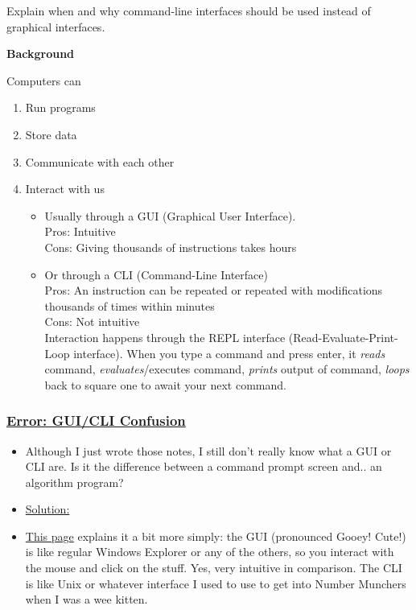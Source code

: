 \documentclass[12pt]{article}
\begin{document}
Explain when and why command-line interfaces should be used instead of graphical interfaces.
\color{black}

\vspace{1em}
\textbf{Background}

Computers can
\begin{enumerate}
    \item Run programs
    \item Store data
    \item Communicate with each other
    \item Interact with us
    \begin{itemize}
        \item Usually through a GUI (Graphical User Interface). 
        \\Pros: Intuitive
        \\Cons: Giving thousands of instructions takes hours
        \item Or through a CLI (Command-Line Interface)
        \\Pros: An instruction can be repeated or repeated with modifications thousands of times within minutes
        \\Cons: Not intuitive
        \\Interaction happens through the REPL interface (Read-Evaluate-Print-Loop interface). When you type a command and press enter, it \textit{reads} command, \textit{evaluates}/executes command, \textit{prints} output of command, \textit{loops} back to square one to await your next command.
    \end{itemize}
\end{enumerate}

\subsubsection{\underline{Error: GUI/CLI Confusion}}\label{error:er12}
\begin{itemize}
    \item Although I just wrote those notes, I still don't really know what a GUI or CLI are. Is it the difference between a command prompt screen and.. an algorithm program?
\end{itemize}
\begin{itemize}
\renewcommand{\labelitemi}{$\nobullet$}
\item \underline{Solution:}
\renewcommand{\labelitemi}{$\bullet$}
    \item \href{https://study.com/academy/lesson/what-is-a-graphical-user-interface-gui-definition-components-examples.html}{This page} explains it a bit more simply: the GUI (pronounced Gooey! Cute!) is like regular Windows Explorer or any of the others, so you interact with the mouse and click on the stuff. Yes, very intuitive in comparison. The CLI is like Unix or whatever interface I used to use to get into Number Munchers when I was a wee kitten.
\end{itemize}
\end{document}
